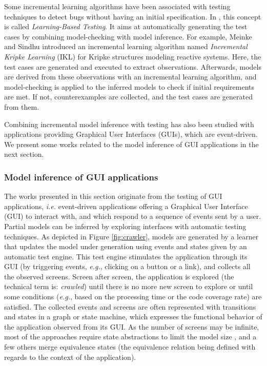 Some incremental learning algorithms have been associated with
testing techniques to detect bugs without having an initial
specification. In \cite{Meinke:2004:ABT:1007512.1007532,tap2011},
this concept is called \textit{Learning-Based Testing}. It aims
at automatically generating the test cases by combining
model-checking with model inference. For example, Meinke and
Sindhu \cite{tap2011} introduced an incremental learning
algorithm named \textit{Incremental Kripke Learning} (IKL) for
Kripke structures modeling reactive systems. Here, the test
cases are generated and executed to extract observations.
Afterwards, models are derived from these observations with an
incremental learning algorithm, and model-checking is applied to
the inferred models to check if initial requirements are met. If
not, counterexamples are collected, and the test cases are
generated from them.

Combining incremental model inference with testing has also been
studied with applications providing Graphical User Interfaces
(GUIs), which are event-driven. We present some works related to
the model inference of GUI applications in the next section.

\subsubsection{Model inference of GUI applications}
\label{sec:active-crawling}

The works presented in this section originate from the testing of
GUI applications, \emph{i.e.} event-driven applications offering a
Graphical User Interface (GUI) to interact with, and which
respond to a sequence of events sent by a user. Partial models
can be inferred by exploring interfaces with automatic testing
techniques. As depicted in Figure \ref{fig:crawler}, models are
generated by a learner that updates the model under generation
using events and states given by an automatic test engine. This
test engine stimulates the application through its GUI (by
triggering events, \emph{e.g.}, clicking on a button or a link), and
collects all the observed screens.  Screen after screen, the
application is explored (the technical term is: \emph{crawled}) until
there is no more new screen to explore or until some conditions
(\emph{e.g.}, based on the processing time or the code coverage rate)
are satisfied. The collected events and screens are often
represented with transitions and states in a graph or state
machine, which expresses the functional behavior of the
application observed from its GUI. As the number of screens may
be infinite, most of the approaches require state abstractions to
limit the model size
\cite{MobiGUITARIEEESoftware2014,guitar,5954416,WPX13,SP15}, and
a few others merge equivalence states
\cite{crawljax:tweb12,4656395} (the equivalence relation being
defined with regards to the context of the application).

